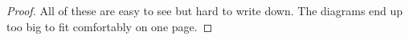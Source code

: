 \documentclass[a4paper,10pt]{scrreprt}
\theoremstyle{definition}
\theoremstyle{plain}
\theoremstyle{remark}
\begin{document}
\begin{proof}
  All of these are easy to see but hard to write down. The diagrams end up too big to fit comfortably on one page.
%
%
\end{proof}
\end{document}
